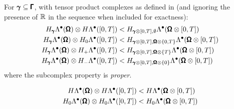             \noindent\makebox[\linewidth]{\rule{\textwidth}{0.4pt}}
            \begin{lemma}
                For $\pmb{\mathsf{\gamma}}  \subseteq  \pmb{\mathsf{\Gamma}}$, with tensor product complexes as defined in \cite{ABB15} (and ignoring the presence of $\mathbb{R}$ in the sequence when included for exactness):
                \begin{align}
                    H_{\pmb{\mathsf{\gamma}}}\Lambda^{\bullet}(\pmb{\mathsf{\Omega}})\otimes H\Lambda^{\bullet}([0, T])  &<  H_{\pmb{\mathsf{\gamma}}\otimes[0, T], \emptyset}\Lambda^{\bullet}(\pmb{\mathsf{\Omega}}\otimes[0, T])  \\
                    H_{\pmb{\mathsf{\gamma}}}\Lambda^{\bullet}(\pmb{\mathsf{\Omega}})\otimes H_{0}\Lambda^{\bullet}([0, T])  &<  H_{\pmb{\mathsf{\gamma}}\otimes[0, T], \pmb{\mathsf{\Omega}}\otimes\{0, T\}}\Lambda^{\bullet}(\pmb{\mathsf{\Omega}}\otimes[0, T])  \\
                    H_{\pmb{\mathsf{\gamma}}}\Lambda^{\bullet}(\pmb{\mathsf{\Omega}})\otimes H_{+}\Lambda^{\bullet}([0, T])  &<  H_{\pmb{\mathsf{\gamma}}\otimes[0, T], \pmb{\mathsf{\Omega}}\otimes\{T\}}\Lambda^{\bullet}(\pmb{\mathsf{\Omega}}\otimes[0, T])  \\
                    H_{\pmb{\mathsf{\gamma}}}\Lambda^{\bullet}(\pmb{\mathsf{\Omega}})\otimes H_{-}\Lambda^{\bullet}([0, T])  &<  H_{\pmb{\mathsf{\gamma}}\otimes[0, T], \pmb{\mathsf{\Omega}}\otimes\{0\}}\Lambda^{\bullet}(\pmb{\mathsf{\Omega}}\otimes[0, T])
                \end{align}
                where the subcomplex property is \emph{proper}.
            \end{lemma}

            \begin{corollary}
                \begin{align}
                    H\Lambda^{\bullet}(\pmb{\mathsf{\Omega}})\otimes H\Lambda^{\bullet}([0, T])  &<  H\Lambda^{\bullet}(\pmb{\mathsf{\Omega}}\otimes[0, T])  \\
                    H_{0}\Lambda^{\bullet}(\pmb{\mathsf{\Omega}})\otimes H_{0}\Lambda^{\bullet}([0, T])  &<  H_{0}\Lambda^{\bullet}(\pmb{\mathsf{\Omega}}\otimes[0, T])
                \end{align}
            \end{corollary}
            \noindent\makebox[\linewidth]{\rule{\textwidth}{0.4pt}}
    